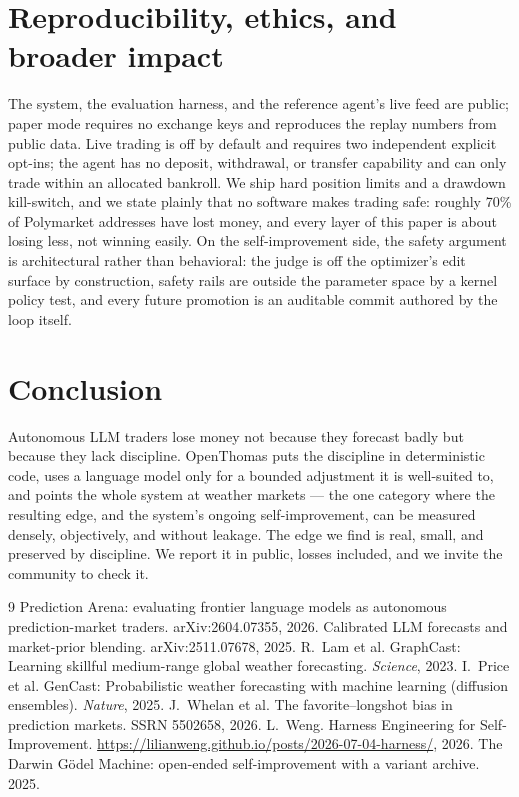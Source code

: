\documentclass[10pt,twocolumn]{article}
\begin{document}
\section{Reproducibility, ethics, and broader impact}

The system, the evaluation harness, and the reference agent's live feed are
public; paper mode requires no exchange keys and reproduces the replay numbers
from public data. Live trading is off by default and requires two independent
explicit opt-ins; the agent has no deposit, withdrawal, or transfer capability
and can only trade within an allocated bankroll. We ship hard position limits and
a drawdown kill-switch, and we state plainly that no software makes trading safe:
roughly 70\% of Polymarket addresses have lost money, and every layer of this
paper is about losing less, not winning easily. On the self-improvement side, the
safety argument is architectural rather than behavioral: the judge is off the
optimizer's edit surface by construction, safety rails are outside the parameter
space by a kernel policy test, and every future promotion is an auditable commit
authored by the loop itself.

\section{Conclusion}

Autonomous LLM traders lose money not because they forecast badly but because
they lack discipline. OpenThomas puts the discipline in deterministic code, uses
a language model only for a bounded adjustment it is well-suited to, and points
the whole system at weather markets --- the one category where the resulting edge,
and the system's ongoing self-improvement, can be measured densely, objectively,
and without leakage. The edge we find is real, small, and preserved by discipline.
We report it in public, losses included, and we invite the community to check it.

\small
\begin{thebibliography}{9}
 Prediction Arena: evaluating frontier language models as
autonomous prediction-market traders. arXiv:2604.07355, 2026.
 Calibrated LLM forecasts and market-prior blending.
arXiv:2511.07678, 2025.
 R.~Lam et al. GraphCast: Learning skillful medium-range
global weather forecasting. \emph{Science}, 2023.
 I.~Price et al. GenCast: Probabilistic weather forecasting with
machine learning (diffusion ensembles). \emph{Nature}, 2025.
 J.~Whelan et al. The favorite--longshot bias in prediction
markets. SSRN 5502658, 2026.
 L.~Weng. Harness Engineering for Self-Improvement.
\url{https://lilianweng.github.io/posts/2026-07-04-harness/}, 2026.
 The Darwin G\"odel Machine: open-ended self-improvement with a
variant archive. 2025.
\end{thebibliography}
\end{document}
